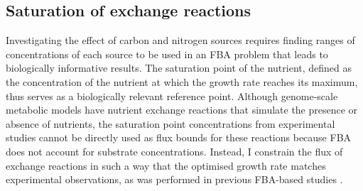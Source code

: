 \subsection{Saturation of exchange reactions}
\label{subsec:model-saturation}

Investigating the effect of carbon and nitrogen sources requires finding ranges of concentrations of each source to be used in an FBA problem that leads to biologically informative results.
The saturation point of the nutrient, defined as the concentration of the nutrient at which the growth rate reaches its maximum, thus serves as a biologically relevant reference point.
Although genome-scale metabolic models have nutrient exchange reactions that simulate the presence or absence of nutrients, the saturation point concentrations from experimental studies cannot be directly used as flux bounds for these reactions because FBA does not account for substrate concentrations.
Instead, I constrain the flux of exchange reactions in such a way that the optimised growth rate matches experimental observations, as was performed in previous FBA-based studies \parencite{elsemmanWholecellModelingYeast2022}.


